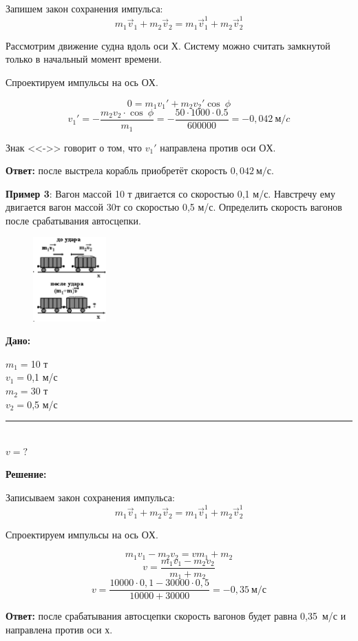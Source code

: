 \documentclass[a5paper, 10pt]{diss_4}
\renewcommand{\'}{\,'}
\begin{document}
  Запишем закон сохранения импульса:
\[
m_1\vec{v}_1+m_2\vec{v}_2=m_1\vec{v}_1^1+m_2\vec{v}_2^1
\]


  Рассмотрим движение судна вдоль оси $Х$. Систему можно считать замкнутой
только в начальный момент времени.

  Спроектируем импульсы на ось $ОХ$.

\[
0=m_1 v_1'+m_2 v_2' \cos\ \phi
\]
\[
v_1'=-\frac{m_2 v_2\cdot \cos\ \phi}{m_1}=-\frac{50\cdot1000\cdot0.5}{600000}=
-0,042\ м/c
\]


Знак <<->> говорит о том, что $v_1'$ направлена против  оси $ОХ$.

\textbf{Ответ:} после выстрела корабль приобретёт скорость $0,042\ м/с$.


  \textbf{Пример 3}: Вагон массой 10 т двигается со скоростью 0,1 м/с.
Навстречу ему двигается вагон массой 30т со скоростью 0,5 м/с. Определить
скорость вагонов после срабатывания автосцепки.


\begin{figure}
\includegraphics[width=0.25\textwidth]{img/img_29.eps}
\label{r29}
\end{figure}
\hspace{1cm}\textbf{Дано:}\hspace{.3cm}
\parbox[t]{4cm}{
$m_1=$10 т\\
$v_1=$0,1 м/с\\
$m_2=$30 т\\
$v_2=$0,5 м/с\\
\rule{4cm}{.4pt}\\
$v=?$\\
}

  \textbf{Решение:}

  Записываем закон сохранения импульса:
\[
m_1\vec{v}_1+m_2\vec{v}_2=m_1\vec{v}_1^1+m_2\vec{v}_2^1
\]

  Спроектируем импульсы на ось $ОХ$.

\[
m_1v_1-m_2v_2=v{m_1+m_2}
\]
\[
v=\frac{m_1v_1-m_2v_2}{m_1+m_2}
\]
\[
v=\frac{10000\cdot0,1-30000\cdot0,5}{10000+30000}=-0,35\ м/с
\]

 \textbf{Ответ:} после срабатывания автосцепки скорость вагонов будет равна
0,35\ м/с и направлена против оси $х$.
\end{document}
